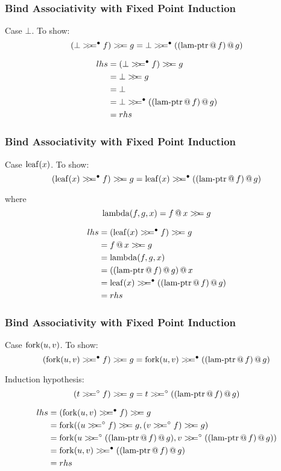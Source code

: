 \documentclass[serif,professionalfont]{beamer}
\begin{document}
\begin{frame}[fragile]
\frametitle{Bind Associativity with Fixed Point Induction}

Case $\bot$. To show:
$$\bind{(\bindb{\bot}{f})}{g} = \bindb{\bot}{\lamptr{f}{g}}$$

\begin{align*}
lhs = & \; \bind{(\bindb{\bot}{f})}{g} \\
    = & \; \bind{\bot}{g}              \\
    = & \; \bot                        \\
    = & \; \bindb{\bot}{\lamptr{f}{g}} \\
    = & \; rhs
\end{align*}

\end{frame}

\begin{frame}[fragile]
\frametitle{Bind Associativity with Fixed Point Induction}

Case $\mathrm{leaf}(x)$. To show:
$$\bind{(\bindb{\leaf{x}}{f})}{g} = \bindb{\leaf{x}}{\lamptr{f}{g}}$$

where
$$\mathrm{lambda}(f,g,x) = f \, @ \, x >\!\!>\!\!= g$$

\begin{align*}
lhs = & \; \bind{(\bindb{\leaf{x}}{f})}{g} \\
    = & \; \bind{\app{f}{x}}{g}            \\
    = & \; \fn{lambda}(f,g,x)              \\
    = & \; \app{\lamptr{f}{g}}{x}          \\
    = & \; \bindb{\leaf{x}}{\lamptr{f}{g}} \\
    = & \; rhs
\end{align*}

\end{frame}

\begin{frame}[fragile]
\frametitle{Bind Associativity with Fixed Point Induction}

Case $\mathrm{fork}(u,v)$. To show:
$$\bind{(\bindb{\fork{u}{v}}{f})}{g} = \bindb{\fork{u}{v}}{\lamptr{f}{g}}$$

Induction hypothesis:
$$\bind{(\bindw{t}{f})}{g} = \bindw{t}{\lamptr{f}{g}}$$


\begin{align*}
lhs = & \; \bind{(\bindb{\fork{u}{v}}{f})}{g} \\
    = & \; \fork{\bind{(\bindw{u}{f})}{g}}{\bind{(\bindw{v}{f})}{g}}\\
    = & \; \fork{\bindw{u}{\lamptr{f}{g}}}{\bindw{v}{\lamptr{f}{g}}} \\
    = & \; \bindb{\fork{u}{v}}{\lamptr{f}{g}} \\
    = & \; rhs
\end{align*}

\end{frame}
\end{document}
